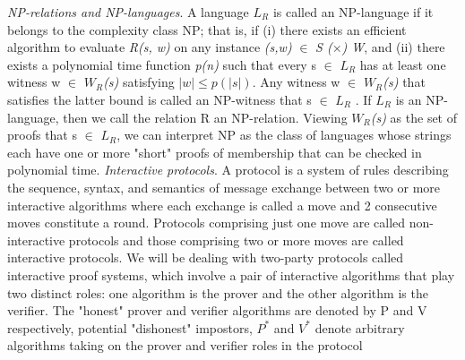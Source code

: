 \documentclass[a4paper]{article}
\begin{document}
\newline
\textit{NP-relations and NP-languages}. A language \textit{$L_R$} is called an NP-language if it belongs to the complexity class NP; that is, if (i) there exists an efficient algorithm to evaluate \textit{R(s, w)} on any instance \textit{(s,w)} $\in$ \textit{S ($\times$) W}, and (ii) there exists a polynomial time function \emph{p(n)} such that every s $\in$ \textit{$L_R$} has at least one witness w $\in$ \textit{$W_R$(s)} satisfying $|w|\leq p(|s|)$.
Any witness w $\in$ \textit{$W_R$(s)} that satisfies the latter bound is called an NP-witness that s $\in$ \textit{$L_R$} . If \textit{$L_R$} is an NP-language, then we call the relation R an NP-relation. Viewing \textit{$W_R$(s)} as the set of proofs that s $\in$ \textit{$L_R$}, we can interpret NP as the class of languages whose strings each have one or more "short" proofs of membership that can be checked in polynomial time.
\newline
\newline
\textit{Interactive protocols}. A protocol is a system of rules describing the sequence, syntax, and semantics of message exchange between two or more interactive algorithms where each exchange is called a move and 2 consecutive moves constitute a round. Protocols comprising just one move are called non-interactive protocols and those comprising two or more moves are called interactive protocols. We will be dealing with two-party protocols called interactive proof systems, which involve a pair of interactive algorithms that play two distinct roles: one algorithm is the prover and the other algorithm is the verifier. The "honest" prover and verifier algorithms are denoted by P and V respectively, potential "dishonest" impostors, \textit{$P^{*}$} and \textit{$V^{*}$} denote arbitrary algorithms taking on the prover and verifier roles in the protocol 
\newline
\end{document}
